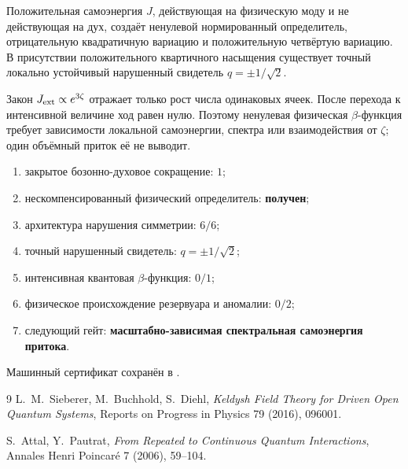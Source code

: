 \begin{theorem}
Положительная самоэнергия $J$, действующая на физическую моду и не
действующая на дух, создаёт ненулевой нормированный определитель,
отрицательную квадратичную вариацию и положительную четвёртую вариацию.
В присутствии положительного квартичного насыщения существует точный
локально устойчивый нарушенный свидетель $q=\pm1/\sqrt2$.
\end{theorem}

\begin{nogocriterion}
Закон $J_{\rm ext}\propto e^{3\zeta}$ отражает только рост числа одинаковых
ячеек. После перехода к интенсивной величине ход равен нулю. Поэтому
ненулевая физическая $\beta$-функция требует зависимости локальной
самоэнергии, спектра или взаимодействия от $\zeta$; один объёмный приток её
не выводит.
\end{nogocriterion}

\begin{protocol}\begin{enumerate}
\item закрытое бозонно-духовое сокращение: \textbf{$1$};
\item нескомпенсированный физический определитель: \textbf{получен};
\item архитектура нарушения симметрии: \textbf{$6/6$};
\item точный нарушенный свидетель: \textbf{$q=\pm1/\sqrt2$};
\item интенсивная квантовая $\beta$-функция: \textbf{$0/1$};
\item физическое происхождение резервуара и аномалии: \textbf{$0/2$};
\item следующий гейт: \textbf{масштабно-зависимая спектральная самоэнергия
притока}.
\end{enumerate}\end{protocol}

Машинный сертификат сохранён в
.

\begin{thebibliography}{9}
L.~M.~Sieberer, M.~Buchhold, S.~Diehl,
\emph{Keldysh Field Theory for Driven Open Quantum Systems},
Reports on Progress in Physics 79 (2016), 096001.

S.~Attal, Y.~Pautrat,
\emph{From Repeated to Continuous Quantum Interactions},
Annales Henri Poincar\'e 7 (2006), 59--104.
\end{thebibliography}